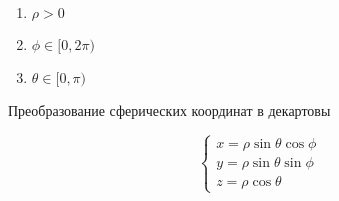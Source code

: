 
\begin{enumerate}
\item
  \(\rho > 0\)
  
\item
  \(\phi \in [0, 2 \pi)\)
  
\item
  \(\theta \in [0, \pi)\)
\end{enumerate}

Преобразование сферических координат в декартовы

\begin{equation*}
  \begin{cases}
    x = \rho \sin \theta \cos \phi \\
    y = \rho \sin \theta \sin \phi \\
    z = \rho \cos \theta
  \end{cases}
\end{equation*}
